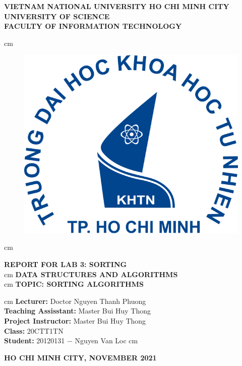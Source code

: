 \documentclass[12pt,a4paper]{article}
\author{Nguyễn Văn Lộc}
\begin{document}
\fancyhf{}
\chead{}
\cfoot{\thepage}
\rfoot{}
\lfoot{}
\pagestyle{fancy}
\renewcommand{\headrulewidth}{0pt}
\renewcommand{\footrulewidth}{0pt}
\begin{titlepage}
\begin{mybox}
\begin{center}
\fontsize{12}{12}\selectfont
\textbf{VIETNAM NATIONAL UNIVERSITY HO CHI MINH CITY}\\
\textbf{UNIVERSITY OF SCIENCE}\\
\textbf{FACULTY OF INFORMATION TECHNOLOGY}
\end{center}
 cm
\begin{figure}[H]
\begin{center}
\includegraphics[scale=0.25]{logo}
\end{center}
\end{figure}
 cm
\begin{center}
\fontsize{18}{14}\selectfont
\textbf{REPORT FOR LAB 3: SORTING}\\
 cm
\fontsize{20}{16}\selectfont
\textbf{DATA STRUCTURES AND ALGORITHMS}\\
 cm
\fontsize{18}{12}\selectfont
\textbf{TOPIC: SORTING ALGORITHMS}
\end{center}
 cm
\fontsize{14}{12}\selectfont
\textbf{Lecturer:} Doctor Nguyen Thanh Phuong\\
\textbf{Teaching Assisstant:} Master Bui Huy Thong\\
\textbf{Project Instructor:} Master Bui Huy Thong\\
\textbf{Class:} 20CTT1TN\\
\textbf{Student:} 20120131 \(-\) Nguyen Van Loc
 cm
\begin{center}
\textbf{HO CHI MINH CITY, NOVEMBER 2021}
\end{center}
\end{mybox}
\end{titlepage}
\end{document}
